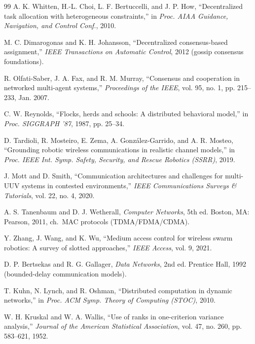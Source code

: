 \begin{thebibliography}{99}
A. K. Whitten, H.-L. Choi, L. F. Bertuccelli, and J. P. How,
``Decentralized task allocation with heterogeneous constraints,''
in \emph{Proc. AIAA Guidance, Navigation, and Control Conf.}, 2010.

M. C. Dimarogonas and K. H. Johansson,
``Decentralized consensus-based assignment,''
\emph{IEEE Transactions on Automatic Control}, 2012 (gossip consensus foundations).

R. Olfati-Saber, J. A. Fax, and R. M. Murray,
``Consensus and cooperation in networked multi-agent systems,''
\emph{Proceedings of the IEEE}, vol. 95, no. 1, pp. 215--233, Jan. 2007.

C. W. Reynolds,
``Flocks, herds and schools: A distributed behavioral model,''
in \emph{Proc. SIGGRAPH '87}, 1987, pp. 25--34.

D. Tardioli, R. Mosteiro, E. Zema, A. Gonz\'alez-Garrido, and A. R. Mosteo,
``Grounding robotic wireless communications in realistic channel models,''
in \emph{Proc. IEEE Int. Symp. Safety, Security, and Rescue Robotics (SSRR)}, 2019.

J. Mott and D. Smith,
``Communication architectures and challenges for multi-UUV systems in contested environments,''
\emph{IEEE Communications Surveys \& Tutorials}, vol. 22, no. 4, 2020.

A. S. Tanenbaum and D. J. Wetherall,
\emph{Computer Networks}, 5th ed.
Boston, MA: Pearson, 2011, ch.\ MAC protocols (TDMA/FDMA/CDMA).

Y. Zhang, J. Wang, and K. Wu,
``Medium access control for wireless swarm robotics: A survey of slotted approaches,''
\emph{IEEE Access}, vol. 9, 2021.

D. P. Bertsekas and R. G. Gallager,
\emph{Data Networks}, 2nd ed.
Prentice Hall, 1992 (bounded-delay communication models).

T. Kuhn, N. Lynch, and R. Oshman,
``Distributed computation in dynamic networks,''
in \emph{Proc. ACM Symp. Theory of Computing (STOC)}, 2010.

W. H. Kruskal and W. A. Wallis,
``Use of ranks in one-criterion variance analysis,''
\emph{Journal of the American Statistical Association}, vol. 47, no. 260, pp. 583--621, 1952.


\end{thebibliography}
